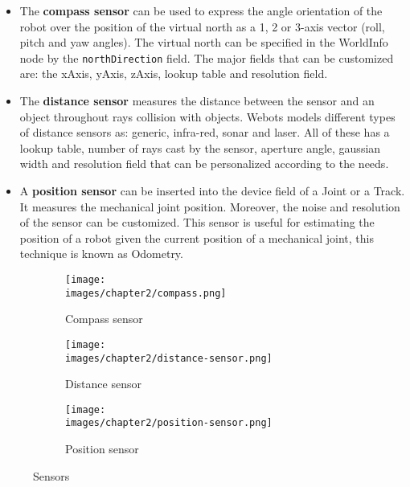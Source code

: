\begin{itemize}
\item{The \textbf{compass sensor} can be used to express the angle orientation of the robot over the position of the virtual north as a 1, 2 or 3-axis vector (roll, pitch and yaw angles). The virtual north can be specified in the WorldInfo node by the \verb|northDirection| field. The major fields that can be customized are: the xAxis, yAxis, zAxis, lookup table and resolution field. }
\item{The \textbf{distance sensor} measures the distance between the sensor and an object throughout rays collision with objects. Webots models different types of distance sensors as: generic, infra-red, sonar and laser. All of these has a lookup table, number of rays cast by the sensor, aperture angle, gaussian width and resolution field that can be personalized according to the needs.}
\item{A \textbf{position sensor} can be inserted into the device field of a Joint or a Track. It measures the mechanical joint position. Moreover, the noise and resolution of the sensor can be customized. This sensor is useful for estimating the position of a robot given the current position of a mechanical joint, this technique is known as Odometry.}
\end{itemize}

\begin{figure}[h!]
  \centering
  \begin{subfigure}[b]{0.3\linewidth}
  	\texttt{[image: \\images/chapter2/compass.png]}
  	\caption{Compass sensor}
  	\label{fig:ch-2:compass}
  \end{subfigure}
  \vspace{0.00mm}
  \begin{subfigure}[b]{0.3\linewidth}
  	\texttt{[image: \\images/chapter2/distance-sensor.png]}
  	\caption{Distance sensor}
  	\label{fig:ch-2:distance-sensor}
  \end{subfigure}
  \vspace{0.00mm}
  \begin{subfigure}[b]{0.3\linewidth}
  	\texttt{[image: \\images/chapter2/position-sensor.png]}
  	\caption{Position sensor}
  	\label{fig:ch-2:position-sensor}
  \end{subfigure}
  \vspace{0.00mm}
  \caption{Sensors}
  \label{fig:ch-2:sensors}
\end{figure}

